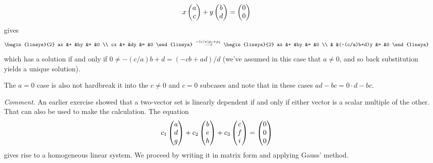 \begin{exercises}
\begin{answer}
\begin{exparts}
          \begin{equation*}
            x\begin{pmatrix} a \\ c \end{pmatrix}
            +y\begin{pmatrix} b \\ d \end{pmatrix}
            =\begin{pmatrix} 0 \\ 0 \end{pmatrix}
          \end{equation*}
          gives
          \begin{equation*}
            \begin{linsys}{2}
               ax  &+  &by &=  &0  \\
               cx  &+  &dy &=  &0  
            \end{linsys}
            \;\grstep{-(c/a)\rho_1+\rho_2}\;
            \begin{linsys}{2}
               ax  &+  &by           &=  &0  \\
                   &   &(-(c/a)b+d)y &=  &0  
             \end{linsys}
          \end{equation*}
          which has a solution if and only if
          \( 0\neq-(c/a)b+d=(-cb+ad)/d \)
          (we've assumed in this case that \( a\neq 0 \), and so 
          back substitution yields a unique solution).

          The \( a=0 \) case is also not hard\Dash break it into the 
          \( c\neq 0 \) and \( c=0 \) subcases and 
          note that in these cases \( ad-bc=0\cdot d-bc \).

          \textit{Comment.}
          An earlier exercise showed that a two-vector set is linearly
          dependent if and only if either vector is a scalar multiple of the
          other.
          That can also be used to make the calculation.
        \partsitem The equation
          \begin{equation*}
            c_1\begin{pmatrix} a \\ d \\ g \end{pmatrix}
            +c_2\begin{pmatrix} b \\ e \\ h \end{pmatrix}
            +c_3\begin{pmatrix} c \\ f \\ i \end{pmatrix}
            =\begin{pmatrix} 0 \\ 0 \\ 0 \end{pmatrix}
          \end{equation*}
         gives rise to a homogeneous linear system.
         We proceed by writing it in matrix form and applying Gauss' method.


\end{exparts}
\end{answer}
\end{exercises}
